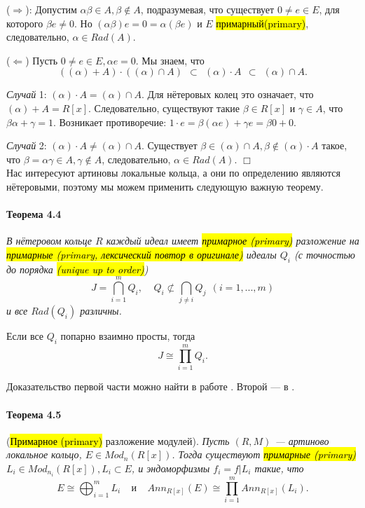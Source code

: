 \documentclass[a4paper,12pt]{article}
\begin{document}
($\Rightarrow$): Допустим $\alpha \beta \in A, \beta \notin A$, подразумевая, что существует $0 \ne e \in E$, для которого $\beta e \ne 0$. Но $(\alpha \beta)e = 0 = \alpha (\beta e)$ и $E$ \hl{примарный(primary)}, следовательно, $\alpha \in Rad(A)$.

($\Leftarrow$) Пусть $0 \ne e \in E, \alpha e = 0$. Мы знаем, что
$$((\alpha)+A) \cdot ((\alpha) \cap A) ~~ \subset ~~ (\alpha) \cdot A ~~ \subset ~~ (\alpha) \cap A.$$

\textit{Случай} 1: $(\alpha) \cdot A = (\alpha) \cap A$. Для нётеровых колец это означает, что $(\alpha) + A = R[x]$. Следовательно, существуют такие $\beta \in R[x]$ и $\gamma \in A$, что $\beta \alpha + \gamma = 1$. Возникает противоречие: $1 \cdot e = \beta (\alpha e) + \gamma e = \beta 0 + 0$. 

\textit{Случай} 2: $(\alpha) \cdot A \ne (\alpha) \cap A$. Существует $\beta \in (\alpha) \cap A, \beta \notin (\alpha) \cdot A$ такое, что $\beta = \alpha \gamma \in A, \gamma \notin A$, следовательно, $\alpha \in Rad(A)$. $\Box$ \\

Нас интересуют артиновы локальные кольца, а они по определению являются нётеровыми, поэтому мы можем применить следующую важную теорему.

\paragraph{Теорема 4.4}
{\itshape
В нётеровом кольце $R$ каждый идеал имеет \hl{примарное (primary)} разложение на \hl{примарные (primary, лексический повтор в оригинале)} идеалы $Q_i$ (с точностью до порядка \hl{(unique up to order)})
$$
J = \bigcap_{i=1}^{m} Q_i, ~~~~~ Q_i \not \subset \bigcap_{j \ne i} Q_j ~~ (i = 1, ..., m)
$$
и все $Rad(Q_i)$ различны.

Если все $Q_i$ попарно взаимно просты, тогда
$$
J \cong \prod_{i=1}^{m} Q_i.
$$
}

Доказательство первой части можно найти в работе \cite{bib3}. Второй --- в \cite{bib13}.

\paragraph{Теорема 4.5}
(\hl{Примарное (primary)} разложение модулей). {\itshape
Пусть $(R, M)$ --- артиново локальное кольцо, $E \in Mod_n (R[x])$. Тогда существуют \hl{примарные (primary)} $L_i \in Mod_{n_i}(R[x]), L_i \subset E$, и эндоморфизмы $f_i = f|L_i$ такие, что
$$
E \cong \bigoplus_{i=1}^m L_i ~~~~~ \textit{и} ~~~~~ Ann_{R[x]}(E) \cong \prod_{i=1}^{m} Ann_{R[x]} (L_i).
$$
}
\end{document}

